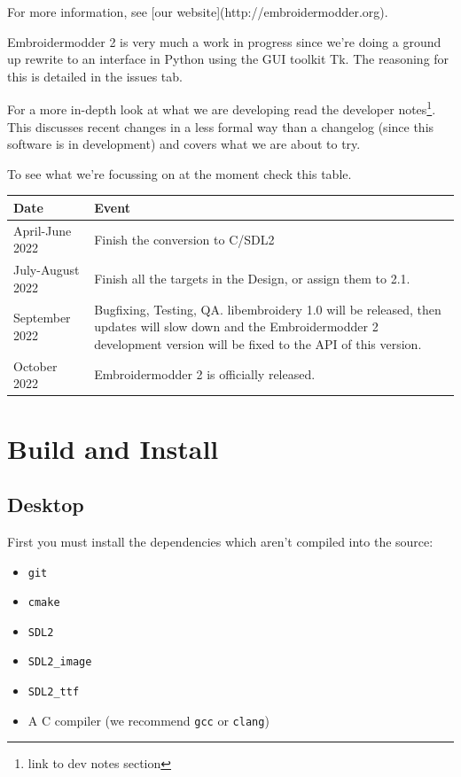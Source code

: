 \documentclass[a4paper, 11pt]{report}
\begin{document}
For more information, see [our website](http://embroidermodder.org).

Embroidermodder 2 is very much a work in progress since we're doing a ground
up rewrite to an interface in Python using the GUI toolkit Tk.
The reasoning for this is detailed in the issues tab.

For a more in-depth look at what we are developing read
the developer notes\footnote{link to dev notes section}.
This discusses recent changes in a less formal way than a
changelog (since this software is in
development) and covers what we are about to try.

To see what we're focussing on at the moment check this table.

\begin{tabular}{l l}
\textbf{Date} & \textbf{Event} \\
\hline
April-June 2022 & Finish the conversion to C/SDL2 \\
July-August 2022 & Finish all the targets in the Design, or assign them to 2.1. \\
September 2022 & Bugfixing, Testing, QA. libembroidery 1.0 will be released, then updates will slow down and the Embroidermodder 2 development version will be fixed to the API of this version. \\
October 2022 & Embroidermodder 2 is officially released.
\end{tabular}

\section{Build and Install}

\subsection{Desktop}

First you must install the dependencies which aren't compiled into the source:

\begin{itemize}
\item \texttt{git}
\item \texttt{cmake}
\item \texttt{SDL2}
\item \texttt{SDL2\_image}
\item \texttt{SDL2\_ttf}
\item A C compiler (we recommend \texttt{gcc} or \texttt{clang})
\end{itemize}
\end{document}
